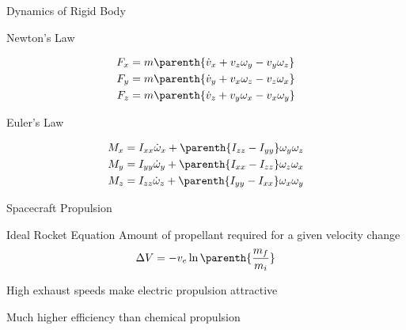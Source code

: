 \begin{frame}[noframenumbering]
\end{frame}%

\begin{frame}[noframenumbering]{Dynamics of Rigid Body} %
    \begin{block}{Newton's Law}
        
        \begin{align*}
            F_x &= m \parenth{\dot{v}_x + v_z \omega_y - v_y \omega_z} \\
            F_y &= m \parenth{\dot{v}_y + v_x \omega_z - v_z \omega_x} \\
            F_z &= m \parenth{\dot{v}_z + v_y \omega_x - v_x \omega_y} \\
        \end{align*}
    \end{block}
    
    \begin{block}{Euler's Law}
        
        \begin{align*}
            {M}_x &= I_{xx} \dot{\omega}_x + \parenth{I_{zz}-I_{yy}} \omega_y \omega_z \\
            {M}_y &= I_{yy} \dot{\omega}_y + \parenth{I_{xx}-I_{zz}} \omega_z \omega_x \\
            {M}_z &= I_{zz} \dot{\omega}_z + \parenth{I_{yy}-I_{xx}} \omega_x \omega_y \\
        \end{align*}
    \end{block}
\end{frame} %

\begin{frame}[noframenumbering]{Spacecraft Propulsion}%
\begin{block}{Ideal Rocket Equation}
    Amount of propellant required for a given velocity change
    \[
        \Delta V = - v_e \ln\parenth{\frac{m_f}{m_i}}
    \]
\end{block}

High exhaust speeds make electric propulsion attractive

Much higher efficiency than chemical propulsion
\end{frame} %


